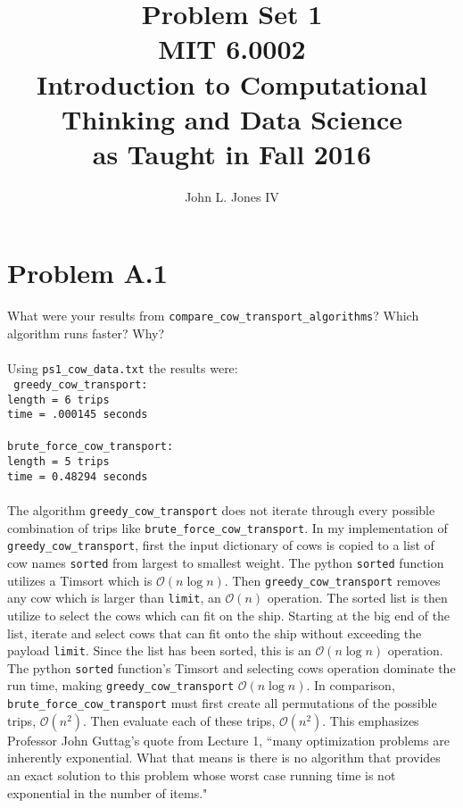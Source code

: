 \documentclass[letterpaper,11pt]{article}
\begin{document}
\title{\Huge{Problem Set 1}\\
\vspace{0.125in}
\Large{MIT 6.0002}\\
\large{Introduction to Computational Thinking and Data Science\\
as Taught in Fall 2016}
}
\author{
John L. Jones IV}
\maketitle
\pagebreak
\section*{Problem A.1}
What were your results from \texttt{compare\_cow\_transport\_algorithms}? Which algorithm runs faster? Why? \\
\\
Using \texttt{ps1\_cow\_data.txt} the results were: \\
\texttt{
  greedy\_cow\_transport:\\
  length =  6 trips \\
  time = .000145 seconds \\
  \\
  brute\_force\_cow\_transport: \\
  length =  5 trips \\
  time = 0.48294 seconds \\
}
\\
The algorithm \texttt{greedy\_cow\_transport} does not iterate through every possible combination of trips
like \texttt{brute\_force\_cow\_transport}.
In my implementation of \texttt{greedy\_cow\_transport}, first the input dictionary of cows is copied to a 
list of cow names \texttt{sorted} from largest to smallest weight. 
The python \texttt{sorted} function utilizes a Timsort which is $\mathcal{O}(n\log{}n)$.
Then \texttt{greedy\_cow\_transport} removes any cow which is larger than \texttt{limit},
an $\mathcal{O}(n)$ operation. 
The sorted list is then utilize to select the cows which can fit on the ship.
Starting at the big end of the list,
iterate and select cows that can fit onto the ship without exceeding the payload \texttt{limit}.
Since the list has been sorted, this is an $\mathcal{O}(n\log{}n)$ operation.
The python \texttt{sorted} function's Timsort and 
selecting cows operation dominate the run time,
making \texttt{greedy\_cow\_transport} $\mathcal{O}(n\log{}n)$.
In comparison, \texttt{brute\_force\_cow\_transport} must first create all permutations of the possible trips, 
$\mathcal{O}(n^{2})$.
Then evaluate each of these trips, $\mathcal{O}(n^{2})$.
This emphasizes Professor John Guttag's quote from Lecture 1, ``many optimization problems are inherently exponential.
What that means is there is no algorithm that provides an exact solution to this problem whose worst case running time
is not exponential in the number of items."
\end{document}

